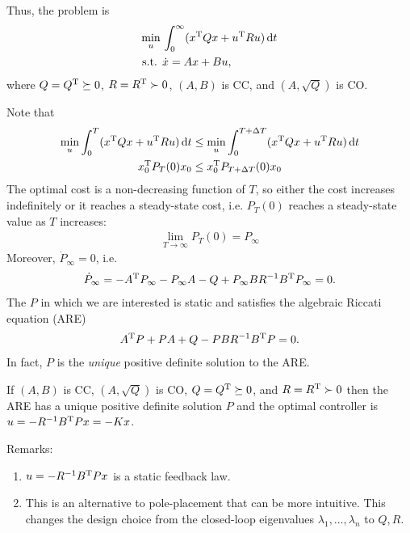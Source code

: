 \noindent
Thus, the problem is
\begin{align}
  \min_u {} & \int_0^\infty (x^\text{T} Qx + u^\text{T} Ru)\mathop{}\!\mathrm{d} t \\
  \text{s.t. } & \dot x = Ax + Bu,
\end{align}
where $Q=Q^\text{T}\succeq0$, $R=R^\text{T}\succ0$, $(A,B)$ is CC, and $(A,\sqrt{Q})$ is CO.

Note that
\begin{gather}
  \min_u \int_0^T (x^\text{T} Qx + u^\text{T} Ru)\mathop{}\!\mathrm{d} t \le \min_u \int_0^{T+\Delta T} (x^\text{T} Qx + u^\text{T} Ru)\mathop{}\!\mathrm{d} t \\
  x_0^\text{T} P_T(0) x_0 \le x_0^\text{T} P_{T+\Delta T}(0) x_0
\end{gather}
The optimal cost is a non-decreasing function of $T$, so either the cost increases indefinitely or it reaches a steady-state cost, i.e. $P_T(0)$ reaches a steady-state value as $T$ increases:
\begin{gather}
  \lim_{T\to\infty} P_T(0) = P_\infty
\end{gather}
Moreover, $\dot P_\infty=0$, i.e.
\begin{gather}
  \dot P_\infty = -A^\text{T} P_\infty - P_\infty A - Q + P_\infty B R^{-1} B^\text{T} P_\infty = 0.
\end{gather}
The $P$ in which we are interested is static and satisfies the algebraic Riccati equation (ARE)
\begin{gather}
  A^\text{T} P + PA + Q - PBR^{-1}B^\text{T} P = 0.
\end{gather}
In fact, $P$ is the \emph{unique} positive definite solution to the ARE.

\begin{thm}
  If $(A,B)$ is CC, $(A,\sqrt{Q})$ is CO, $Q=Q^\text{T}\succeq0$, and $R=R^\text{T}\succ0$ then the ARE has a unique positive definite solution $P$ and the optimal controller is $u=-R^{-1}B^\text{T} Px=-Kx$.
\end{thm}

\noindent
Remarks:
\begin{enumerate}[nosep]
\item $u=-R^{-1}B^\text{T} Px$ is a static feedback law.
\item This is an alternative to pole-placement that can be more intuitive. This changes the design choice from the closed-loop eigenvalues $\lambda_1,\dots,\lambda_n$ to $Q,R$.
\end{enumerate}

